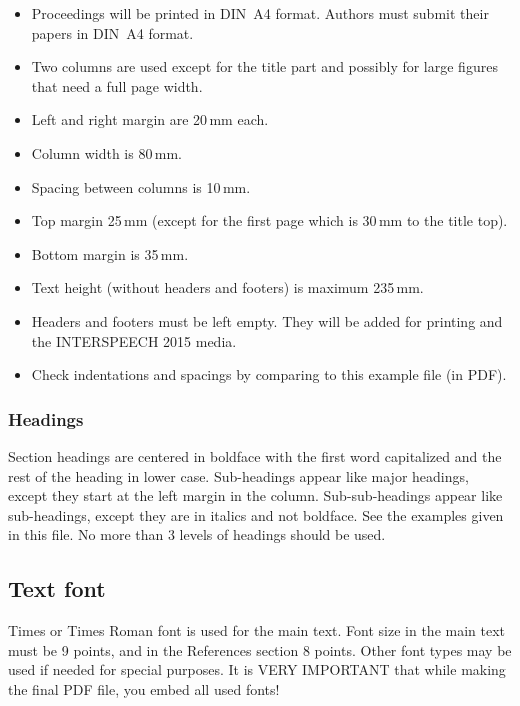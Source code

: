 \documentclass[a4paper]{article}
\begin{document}
      \begin{itemize}
        \item Proceedings will be printed in DIN~A4 format. Authors must submit their papers in DIN~A4 format.
        \item Two columns are used except for the title part and possibly for large figures that need a full page width.
        \item Left and right margin are 20\,mm each.
        \item Column width is 80\,mm.
        \item Spacing between columns is 10\,mm.
        \item Top margin 25\,mm (except for the first page which is 30\,mm to the title top).
        \item Bottom margin is 35\,mm.
        \item Text height (without headers and footers) is maximum 235\,mm.
        \item Headers and footers must be left empty. They will be added for printing and the INTERSPEECH 2015 media.
        \item Check indentations and spacings by comparing to this example file (in PDF).
      \end{itemize}


      \subsubsection{Headings}

        Section headings are centered in boldface with the first word capitalized and the rest of the heading in lower case.
        Sub-headings appear like major headings, except they start at the left margin in the column.
        Sub-sub-headings appear like sub-headings, except they are in italics and not boldface. 
        See the examples given in this file. 
        No more than 3 levels of headings should be used.

  
    \subsection{Text font}

      Times or Times Roman font is used for the main text. 
      Font size in the main text must be 9 points, and in the References section 8 points. 
      Other font types may be used if needed for special purposes. 
      It is VERY IMPORTANT that while making the final PDF file, you embed all used fonts!
\end{document}
